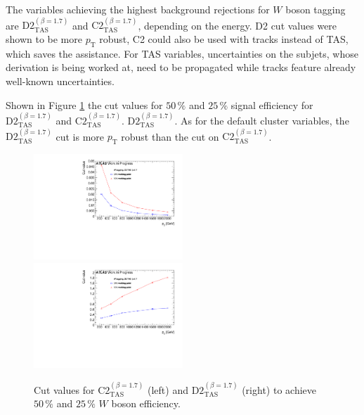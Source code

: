 The variables achieving the highest background rejections for $W$ boson tagging are $\text{D2}_{\text{TAS}}^{(\beta=1.7)}$ and $\text{C2}_{\text{TAS}}^{(\beta=1.7)}$, depending on the energy. D2 cut values were shown to be more $p_{\mathrm{T}}$ robust, C2 could also be used with tracks instead of TAS, which saves the assistance. For TAS variables, uncertainties on the subjets, whose derivation is being worked at, need to be propagated while tracks feature already well-known uncertainties.


Shown in Figure \ref{fig:w_cut} the cut values for $50\,\%$ and $25\,\%$ signal efficiency for $\text{D2}_{\text{TAS}}^{(\beta=1.7)}$ and $\text{C2}_{\text{TAS}}^{(\beta=1.7)}$. $\text{D2}_{\text{TAS}}^{(\beta=1.7)}$. As for the default cluster variables, the $\text{D2}_{\text{TAS}}^{(\beta=1.7)}$ cut is more $p_{\mathrm{T}}$ robust than the cut on $\text{C2}_{\text{TAS}}^{(\beta=1.7)}$. 
\begin{figure}
\includegraphics[width=0.5\textwidth]{sascha_input/plots/W/cut_value/c2_tas17.pdf} \hspace{1mm}
\includegraphics[width=0.5\textwidth]{sascha_input/plots/W/cut_value/d2_tas17.pdf}	
\caption{\footnotesize{Cut values for $\text{C2}_{\text{TAS}}^{(\beta=1.7)}$ (left) and $\text{D2}_{\text{TAS}}^{(\beta=1.7)}$ (right) to achieve $50\,\%$ and $25\,\%$ $W$ boson efficiency.}}\label{fig:w_cut}
\end{figure}

